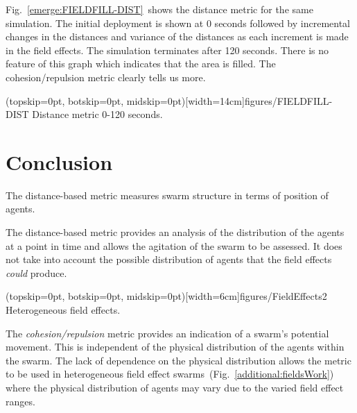 \documentclass{ieeeaccess}
\begin{document}
Fig.~\ref{emerge:FIELDFILL-DIST}~shows the distance metric for the same simulation. The initial deployment is shown at 0 seconds followed by incremental changes in the distances and variance of the distances as each increment is made in the field effects. The simulation terminates after 120 seconds. There is no feature of this graph which indicates that the area is filled. The cohesion/repulsion metric clearly tells us more. 

\Figure[t!](topskip=0pt, botskip=0pt, midskip=0pt)[width=14cm]{figures/FIELDFILL-DIST}
{Distance metric 0-120 seconds.\label{emerge:FIELDFILL-DIST}}


\section{Conclusion\label{metric:MagnitudeDistanceComparison}}
The distance-based metric measures swarm structure in terms of position of agents.

The distance-based metric provides an analysis of the distribution of the agents at a point in time and allows the agitation of the swarm to be assessed. It does not take into account the possible distribution of agents that the field effects \emph{could} produce.

\Figure[t!](topskip=0pt, botskip=0pt, midskip=0pt)[width=6cm]{figures/FieldEffects2}
{Heterogeneous field effects.\label{additional:fieldsWork}}

The \emph{cohesion/repulsion} metric provides an indication of a swarm's potential movement. This is independent of the physical distribution of the agents within the swarm. The lack of dependence on the physical distribution allows the metric to be used in heterogeneous field effect swarms~(Fig.~\ref{additional:fieldsWork}) where the physical distribution of agents may vary due to the varied field effect ranges. 
\end{document}
